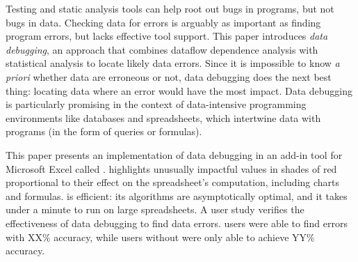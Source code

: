 Testing and static analysis tools can help root out bugs in programs,
but not bugs in data. Checking data for errors is arguably as
important as finding program errors, but lacks effective tool
support. This paper introduces \emph{data debugging}, an approach that
combines dataflow dependence analysis with statistical analysis to
locate likely data errors. Since it is impossible to know \emph{a
priori} whether data are erroneous or not, data debugging does the
next best thing: locating data where an error would have the most
impact. Data debugging is particularly promising in the context of
data-intensive programming environments like databases and
spreadsheets, which intertwine data with programs (in the form of
queries or formulas).

This paper presents an implementation of data debugging in an add-in
tool for Microsoft Excel called \checkcell{}. \checkcell{} highlights
unusually impactful values in shades of red proportional to their
effect on the spreadsheet's computation, including charts and
formulas. \checkcell{} is efficient: its algorithms are asymptotically
optimal, and it takes under a minute to run on large spreadsheets. A
user study verifies the effectiveness of data debugging to find
data errors. \checkcell{} users were able to find errors with XX\%
accuracy, while users without were only able to achieve YY\% accuracy.
